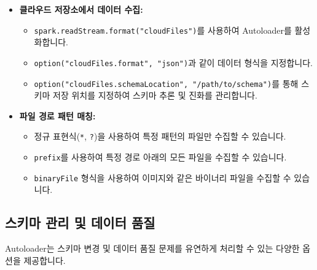 \documentclass[11pt,a4paper]{article}
\theoremstyle{definition}
\begin{document}
\begin{itemize}
    \item \textbf{클라우드 저장소에서 데이터 수집:}
    \begin{itemize}
        \item \texttt{spark.readStream.format("cloudFiles")}를 사용하여 Autoloader를 활성화합니다.
        \item \texttt{option("cloudFiles.format", "json")}과 같이 데이터 형식을 지정합니다.
        \item \texttt{option("cloudFiles.schemaLocation", "/path/to/schema")}를 통해 스키마 저장 위치를 지정하여 스키마 추론 및 진화를 관리합니다.
    \end{itemize}
    \item \textbf{파일 경로 패턴 매칭:}
    \begin{itemize}
        \item 정규 표현식(\texttt{*}, \texttt{?})을 사용하여 특정 패턴의 파일만 수집할 수 있습니다.
        \item \texttt{prefix}를 사용하여 특정 경로 아래의 모든 파일을 수집할 수 있습니다.
        \item \texttt{binaryFile} 형식을 사용하여 이미지와 같은 바이너리 파일을 수집할 수 있습니다.
    \end{itemize}
\end{itemize}

\subsection{스키마 관리 및 데이터 품질}
Autoloader는 스키마 변경 및 데이터 품질 문제를 유연하게 처리할 수 있는 다양한 옵션을 제공합니다.
\end{document}
